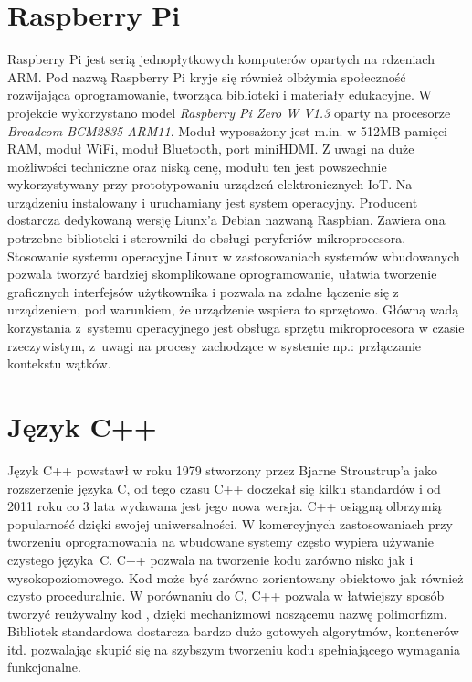 \documentclass[12pt, eng, twoside, openany, final]{mgr}
\begin{document}
    \section{Raspberry Pi}
    Raspberry Pi jest serią jednopłytkowych komputerów opartych na rdzeniach ARM. Pod nazwą Raspberry Pi kryje się również olbżymia społeczność rozwijająca oprogramowanie, tworząca biblioteki i materiały edukacyjne.
    W projekcie wykorzystano model \emph{Raspberry Pi Zero W V1.3} oparty na procesorze  \emph{Broadcom BCM2835 ARM11}\cite{RpiData}. Moduł wyposażony jest m.in. w 512MB pamięci RAM, moduł WiFi, moduł Bluetooth, port miniHDMI. Z uwagi na  duże możliwości techniczne oraz niską cenę, modułu ten jest powszechnie wykorzystywany przy prototypowaniu urządzeń elektronicznych IoT. 
    Na urządzeniu instalowany i uruchamiany jest system operacyjny. Producent dostarcza dedykowaną wersję Liunx'a Debian nazwaną Raspbian. Zawiera ona potrzebne biblioteki i sterowniki do obsługi peryferiów mikroprocesora. Stosowanie systemu operacyjne Linux w zastosowaniach systemów wbudowanych pozwala tworzyć bardziej skomplikowane oprogramowanie, ułatwia tworzenie graficznych interfejsów użytkownika i pozwala na zdalne łączenie się z urządzeniem, pod warunkiem, że urządzenie wspiera to sprzętowo. Główną wadą korzystania z~systemu operacyjnego jest obsługa sprzętu mikroprocesora w czasie rzeczywistym, z~uwagi na procesy zachodzące w systemie np.: przłączanie kontekstu wątków. 
    \section{Język C++}
    Język C++ powstawł w roku 1979 stworzony przez Bjarne Stroustrup'a jako rozszerzenie języka C, od tego czasu C++ doczekał się kilku standardów i od 2011 roku co 3 lata wydawana jest jego nowa wersja. C++ osiągną olbrzymią popularność dzięki swojej uniwersalności. W komercyjnych zastosowaniach przy tworzeniu oprogramowania na wbudowane systemy  często wypiera używanie czystego języka~C. C++ pozwala na tworzenie kodu zarówno nisko jak i wysokopoziomowego. Kod może być zarówno zorientowany obiektowo jak również czysto proceduralnie. W porównaniu do C, C++ pozwala w łatwiejszy sposób tworzyć reużywalny kod \cite{EffectiveModern}, dzięki mechanizmowi noszącemu nazwę polimorfizm. Bibliotek standardowa dostarcza bardzo dużo gotowych algorytmów, kontenerów itd. pozwalając skupić się na szybszym tworzeniu kodu spełniającego wymagania funkcjonalne.

    \newpage
\end{document}
